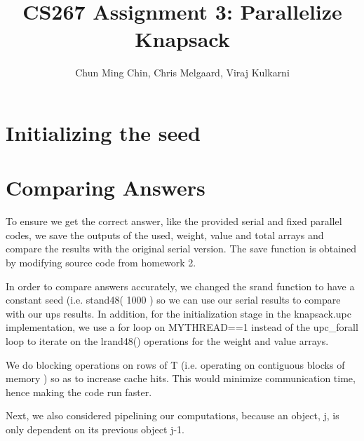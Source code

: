 \documentclass[11pt]{amsart}
\title{CS267 Assignment 3: Parallelize Knapsack}
\author{Chun Ming Chin, Chris Melgaard, Viraj Kulkarni }
\begin{document}
\maketitle

\section{Initializing the seed}



\section{Comparing Answers}

To ensure we get the correct answer, like the provided serial and fixed parallel codes, we save the outputs of the used, weight, value and total arrays and compare the results with the original serial version. The save function is obtained by modifying source code from homework 2.

In order to compare answers accurately, we changed the srand function to have a constant seed (i.e. stand48( 1000 ) so we can use our serial results to compare with our ups results. In addition, for the initialization stage in the knapsack.upc implementation, we use a for loop on MYTHREAD==1 instead of the upc_forall loop to iterate on the lrand48() operations for the weight and value arrays. 

We do blocking operations on rows of T (i.e. operating on contiguous blocks of memory )  so as to increase cache hits. This would minimize communication time, hence making the code run faster. 

Next, we also considered pipelining our computations, because an object, j, is only dependent on its previous object j-1.
\end{document}
